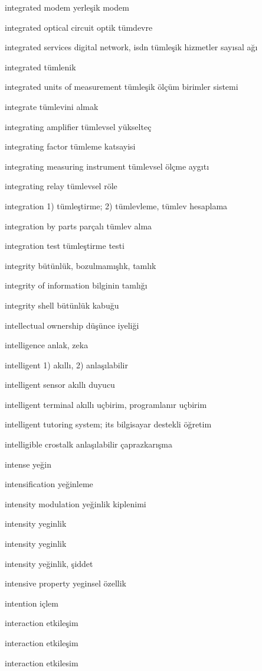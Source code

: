 \documentclass[12pt,fleqn]{article}\usepackage{../../common}
\begin{document}
integrated modem yerleşik modem

integrated optical circuit optik tümdevre

integrated services digital network, isdn tümleşik hizmetler sayısal ağı

integrated tümlenik

integrated units of measurement tümleşik ölçüm birimler sistemi

integrate tümlevini almak

integrating amplifier tümlevsel yükselteç

integrating factor tümleme katsayisi

integrating measuring instrument tümlevsel ölçme aygıtı

integrating relay tümlevsel röle

integration 1) tümleştirme; 2) tümlevleme, tümlev hesaplama

integration by parts parçalı tümlev alma

integration test tümleştirme testi

integrity bütünlük, bozulmamışlık, tamlık

integrity of information bilginin tamlığı

integrity shell bütünlük kabuğu

intellectual ownership düşünce iyeliği

intelligence anlak, zeka

intelligent 1) akıllı, 2) anlaşılabilir

intelligent sensor akıllı duyucu

intelligent terminal akıllı uçbirim, programlanır uçbirim

intelligent tutoring system; its bilgisayar destekli öğretim

intelligible crostalk anlaşılabilir çaprazkarışma

intense yeğin

intensification yeğinleme

intensity modulation yeğinlik kiplenimi

intensity yeginlik

intensity yeginlik

intensity yeğinlik, şiddet

intensive property yeginsel özellik

intention içlem

interaction etkileşim

interaction etkileşim

interaction etkilesim
\end{document}
